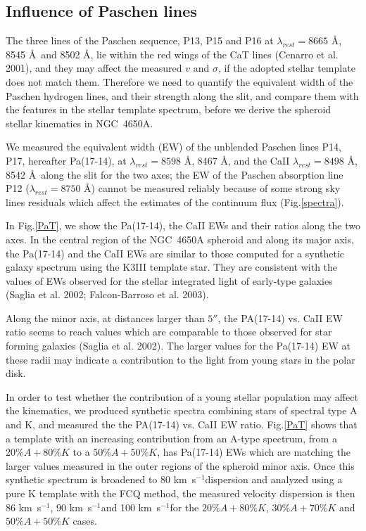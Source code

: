 \documentclass[12pt,preprint]{aastex}
\newcommand{\kms}{\mbox{km~s$^{-1}$}}
\begin{document}
\subsection{Influence of Paschen lines}\label{Paschen}

The three lines of the Paschen sequence, P13, P15 and P16 at
$\lambda_{rest}=8665$ \AA, 8545 \AA\ and 8502 \AA, lie within the red
wings of the CaT lines (Cenarro et al. 2001), and they may affect the
measured $v$ and $\sigma$, if the adopted stellar template does not
match them. Therefore we need to quantify the equivalent width of the
Paschen hydrogen lines, and their strength along the slit, and compare
them with the features in the stellar template spectrum, before we
derive the spheroid stellar kinematics in NGC~4650A.

We measured the equivalent width (EW) of the unblended Paschen lines
P14, P17, hereafter Pa(17-14), at $\lambda_{rest}= 8598$ \AA, 8467
\AA, and the CaII $\lambda_{rest}= 8498$ \AA, 8542 \AA\ along the slit
for the two axes; the EW of the Paschen absorption line P12
($\lambda_{rest}= 8750$ \AA) cannot be measured reliably because of
some strong sky lines residuals which affect the estimates of the
continuum flux (Fig.\ref{spectra}).

In Fig.\ref{PaT}, we show the Pa(17-14), the CaII EWs
and their ratios along the two axes. In the central region of the
NGC~4650A spheroid and along its major axis, the Pa(17-14) and the
CaII EWs are similar to those computed for a synthetic
galaxy spectrum using the K3III template star. They
are consistent with the values of EWs observed for the stellar integrated
light of early-type galaxies (Saglia et al. 2002; Falcon-Barroso et
al. 2003).

Along the minor axis, at distances larger than $5''$, the PA(17-14)
vs.  CaII EW ratio seems to reach values which are comparable to those
observed for star forming galaxies (Saglia et al. 2002). The larger
values for the Pa(17-14) EW at these radii may indicate a contribution
to the light from young stars in the polar disk.  

In order to test whether the contribution of a young stellar
population may affect the kinematics, we produced synthetic spectra
combining stars of spectral type A and K, and measured the the
PA(17-14) vs. CaII EW ratio. Fig.\ref{PaT} shows that a template with
an increasing contribution from an A-type spectrum, from a $20\% A +
80\% K$ to a $50\% A + 50\% K$, has Pa(17-14) EWs which are matching
the larger values measured in the outer regions of the spheroid minor
axis. Once this synthetic spectrum is broadened to 80 \kms dispersion
and analyzed using a pure K template with the FCQ method, the measured
velocity dispersion is then 86 \kms, 90 \kms and 100 \kms for the
$20\%A+80\%K$, $30\%A+70\%K$ and $50\%A+50\%K$ cases.  
\end{document}
